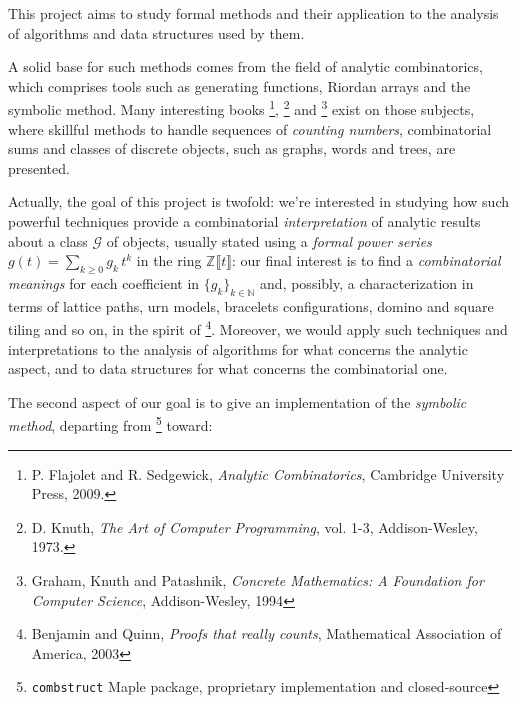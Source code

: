 
\noindent This project aims to study formal methods and their application to
the analysis of algorithms and data structures used by them.

A solid base for such
methods comes from the field of analytic combinatorics, which comprises tools
such as generating functions, Riordan arrays and the symbolic method. Many
interesting books \footnote{P. Flajolet and R. Sedgewick, \emph{Analytic
Combinatorics}, Cambridge University Press, 2009.}, \footnote{D. Knuth,
\emph{The Art of Computer Programming}, vol.  1-3, Addison-Wesley, 1973.} and
\footnote{Graham, Knuth and Patashnik, \emph{Concrete Mathematics: A Foundation
for Computer Science}, Addison-Wesley, 1994} exist on those subjects, where
    skillful methods to handle sequences of \emph{counting numbers},
    combinatorial sums and classes of discrete objects, such as graphs, words
    and trees, are presented. 

Actually, the goal of this project is twofold: we're interested in studying how such powerful techniques
provide a combinatorial \emph{interpretation} of analytic results about a class
$\mathcal{G}$ of objects, usually stated using a \emph{formal power series}
$g(t)=\sum_{k\geq0}{g_{k}\,t^{k}}$ in the ring $\mathbb{Z}\llbracket t
\rrbracket$: our final interest is to find a \emph{combinatorial meanings} for
each coefficient in $\lbrace g_{k}\rbrace_{k\in\mathbb{N}}$ and, possibly, a
characterization in terms of lattice paths, urn models, bracelets
configurations, domino and square tiling and so on, in the spirit of
\footnote{Benjamin and Quinn, \emph{Proofs that really counts}, Mathematical
Association of America, 2003}.  Moreover, we would apply such techniques and
interpretations to the analysis of algorithms for what concerns the analytic
aspect, and to data structures for what concerns the combinatorial one. 

The second aspect of our goal is to give an implementation of the
\emph{symbolic method}, departing from \footnote{\texttt{combstruct} Maple
package, proprietary implementation and closed-source} toward: 
    
